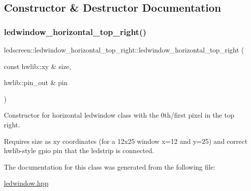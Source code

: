 \subsection{Constructor \& Destructor Documentation}
\mbox{\label{classledscreen_1_1ledwindow__horizontal__top__right_a864a5836127de54c05fcce051c8bf93a}} 
\subsubsection{\texorpdfstring{ledwindow\+\_\+horizontal\+\_\+top\+\_\+right()}{ledwindow\_horizontal\_top\_right()}}
{\footnotesize\ttfamily ledscreen\+::ledwindow\+\_\+horizontal\+\_\+top\+\_\+right\+::ledwindow\+\_\+horizontal\+\_\+top\+\_\+right (\begin{DoxyParamCaption}\item[{const hwlib\+::xy \&}]{size,  }\item[{hwlib\+::pin\+\_\+out \&}]{pin }\end{DoxyParamCaption})\hspace{0.3cm}{\ttfamily [inline]}}



Constructor for horizontal ledwindow class with the 0th/first pixel in the top right. 

Requires size as xy coordinates (for a 12x25 window x=12 and y=25) and correct hwlib-\/style gpio pin that the ledstrip is connected. 

The documentation for this class was generated from the following file\+:\begin{DoxyCompactItemize}
\item 
\hyperlink{ledwindow_8hpp}{ledwindow.\+hpp}\end{DoxyCompactItemize}
